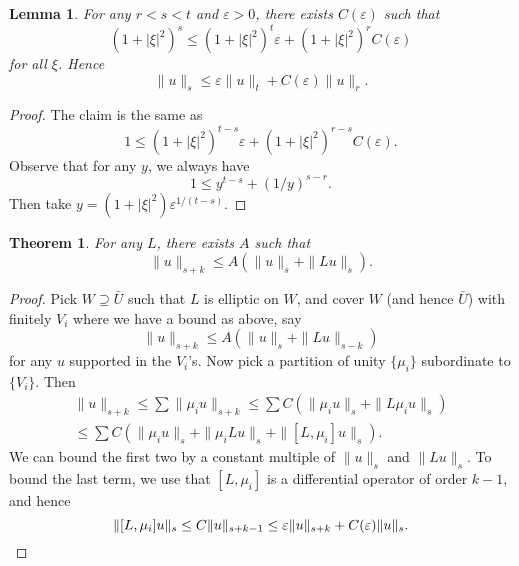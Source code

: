 \documentclass{shortart}
\newtheorem*{thm}{Theorem}
\newtheorem*{lemma}{Lemma}
\theoremstyle{definition}
\begin{document}
\begin{lemma}
  For any $r < s < t$ and $\varepsilon > 0$, there exists $C(\varepsilon)$ such that
  \[
    (1 + |\xi|^2)^s \leq (1 + |\xi|^2)^t \varepsilon + (1 + |\xi|^2)^r C(\varepsilon)
  \]
  for all $\xi$. Hence
  \[
    \|u\|_s \leq \varepsilon \|u\|_t + C(\varepsilon) \|u\|_r.
  \]
\end{lemma}

\begin{proof}
  The claim is the same as
  \[
    1 \leq (1 + |\xi|^2)^{t - s} \varepsilon + (1 + |\xi|^2)^{r - s} C(\varepsilon).
  \]
  Observe that for any $y$, we always have
  \[
    1 \leq y^{t - s} + (1/y)^{s - r}.
  \]
  Then take $y = (1 + |\xi|^2) \varepsilon^{1/(t - s)}$.
\end{proof}

\begin{thm}
  For any $L$, there exists $A$ such that
  \[
    \|u\|_{s + k} \leq A (\|u\|_s + \|Lu\|_s).
  \]
\end{thm}

\begin{proof}
  Pick $W \supseteq \bar{U}$ such that $L$ is elliptic on $W$, and cover $W$ (and hence $\bar{U}$) with finitely $V_i$ where we have a bound as above, say
  \[
    \|u\|_{s + k} \leq A (\|u\|_s + \|Lu\|_{s - k})
  \]
  for any $u$ supported in the $V_i$'s. Now pick a partition of unity $\{\mu_i\}$ subordinate to $\{V_i\}$. Then
  \begin{multline*}
    \|u\|_{s + k} \leq \sum \|\mu_i u\|_{s + k} \leq \sum C(\|\mu_i u\|_s + \|L \mu_i u\|_s)\\
    \leq \sum C(\|\mu_i u\|_s + \|\mu_i Lu\|_s + \|[L, \mu_i] u\|_s).
  \end{multline*}
  We can bound the first two by a constant multiple of $\|u\|_s$ and $\|Lu\|_s$. To bound the last term, we use that $[L, \mu_i]$ is a differential operator of order $k - 1$, and hence
  \[
    \|[L, \mu_i] u\|_s \leq C \|u\|_{s + k - 1} \leq \varepsilon \|u\|_{s + k} + C(\varepsilon) \|u\|_s.\qedhere
  \]
\end{proof}
\end{document}
